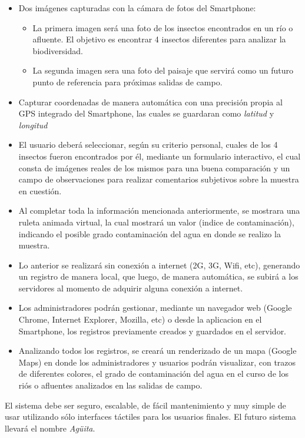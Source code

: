     \begin{itemize}
            \item Dos imágenes capturadas con la cámara de fotos del Smartphone:
            \begin{itemize}
                \item La primera imagen será una foto de los insectos encontrados en un río o afluente. El objetivo es encontrar 4 insectos diferentes para analizar la biodiversidad.
                \item La segunda imagen sera una foto del paisaje que servirá como un futuro punto de referencia para próximas salidas de campo. 
            \end{itemize}
            \item Capturar coordenadas de manera automática con una precisión propia al GPS integrado del Smartphone, las cuales se guardaran como \emph{latitud} y \emph{longitud}
            \item El usuario deberá seleccionar, según su criterio personal, cuales de los 4 insectos fueron encontrados por él, mediante un formulario interactivo, el cual consta de imágenes reales de los mismos para una buena comparación y un campo de observaciones para realizar comentarios subjetivos sobre la muestra en cuestión.
            \item Al completar toda la información mencionada anteriormente, se mostrara una ruleta animada virtual, la cual mostrará un valor (indice de contaminación), indicando el posible grado contaminación del agua en donde se realizo la muestra.
        \item Lo anterior se realizará sin conexión a internet (2G, 3G, Wifi, etc), generando un registro de manera local, que luego, de manera automática, se subirá a los servidores al momento de adquirir alguna conexión a internet.
        \item Los administradores podrán gestionar, mediante un navegador web (Google Chrome, Internet Explorer, Mozilla, etc) o desde la aplicacion en el Smartphone, los registros previamente creados y guardados en el servidor. 
        \item Analizando todos los registros, se creará un renderizado de un mapa  (Google Maps) en donde los administradores y usuarios podrán visualizar, con trazos de diferentes colores, el grado de contaminación del agua en el curso de los riós o afluentes analizados en las salidas de campo.
    \end{itemize}
 

El sistema debe ser seguro, escalable, de fácil mantenimiento y muy simple de usar utilizando sólo interfaces táctiles para los usuarios finales. El futuro sistema llevará el nombre \emph{Agüita}.

